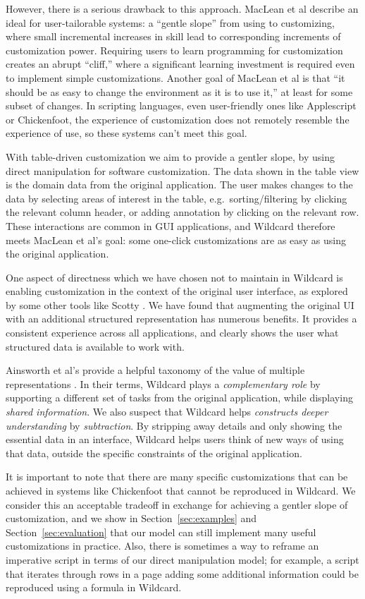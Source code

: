 \documentclass[sigplan,10pt,anonymous,review]{acmart}
\begin{document}
However, there is a serious drawback to this approach. MacLean et al
\citep{maclean1990} describe an ideal for user-tailorable systems: a
``gentle slope'' from using to customizing, where small incremental
increases in skill lead to corresponding increments of customization
power. Requiring users to learn programming for customization creates an
abrupt ``cliff,'' where a significant learning investment is required
even to implement simple customizations. Another goal of MacLean et al
is that ``it should be as easy to change the environment as it is to use
it,'' at least for some subset of changes. In scripting languages, even
user-friendly ones like Applescript or Chickenfoot, the experience of
customization does not remotely resemble the experience of use, so these
systems can't meet this goal.

With table-driven customization we aim to provide a gentler slope, by
using direct manipulation for software customization. The data shown in
the table view is the domain data from the original application. The
user makes changes to the data by selecting areas of interest in the
table, e.g.~sorting/filtering by clicking the relevant column header, or
adding annotation by clicking on the relevant row. These interactions
are common in GUI applications, and Wildcard therefore meets MacLean et
al's goal: some one-click customizations are as easy as using the
original application.

One aspect of directness which we have chosen not to maintain in
Wildcard is enabling customization in the context of the original user
interface, as explored by some other tools like Scotty
\citep{eagan2011}. We have found that augmenting the original UI with an
additional structured representation has numerous benefits. It provides
a consistent experience across all applications, and clearly shows the
user what structured data is available to work with.

Ainsworth et al's provide a helpful taxonomy of the value of multiple
representations \citep{ainsworth1999}. In their terms, Wildcard plays a
\emph{complementary role} by supporting a different set of tasks from
the original application, while displaying \emph{shared information}. We
also suspect that Wildcard helps \emph{constructs deeper understanding}
by \emph{subtraction}. By stripping away details and only showing the
essential data in an interface, Wildcard helps users think of new ways
of using that data, outside the specific constraints of the original
application.

It is important to note that there are many specific customizations that
can be achieved in systems like Chickenfoot \citep{bolin2005} that
cannot be reproduced in Wildcard. We consider this an acceptable
tradeoff in exchange for achieving a gentler slope of customization, and
we show in Section~\ref{sec:examples} and Section~\ref{sec:evaluation}
that our model can still implement many useful customizations in
practice. Also, there is sometimes a way to reframe an imperative script
in terms of our direct manipulation model; for example, a script that
iterates through rows in a page adding some additional information could
be reproduced using a formula in Wildcard.
\end{document}
